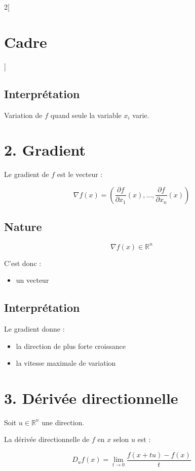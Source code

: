 \documentclass[a4paper,12pt]{article}
\begin{document}
\begin{multicols}{2}[
    \section*{Cadre}
    ]
        \subsection*{Interprétation}

        Variation de $f$ quand seule la variable $x_i$ varie.

    \section*{2. Gradient}

        Le gradient de $f$ est le vecteur :

        $$
        \nabla f(x)
        =
        \left(
        \frac{\partial f}{\partial x_1}(x),
        \dots,
        \frac{\partial f}{\partial x_n}(x)
        \right)
        $$

        \subsection*{Nature}

        $$
        \nabla f(x)\in\mathbb{R}^n
        $$

        C'est donc :
        \begin{itemize}
            \item un vecteur
        \end{itemize}

        \subsection*{Interprétation}

        Le gradient donne :
        \begin{itemize}
            \item la direction de plus forte croissance
            \item la vitesse maximale de variation
        \end{itemize}

    \section*{3. Dérivée directionnelle}

        Soit $u\in\mathbb{R}^n$ une direction.

        La dérivée directionnelle de $f$ en $x$ selon $u$ est :

        $$
        D_u f(x)
        =
        \lim_{t\to 0}
        \frac{f(x+tu)-f(x)}{t}
        $$


\end{multicols}
\end{document}
